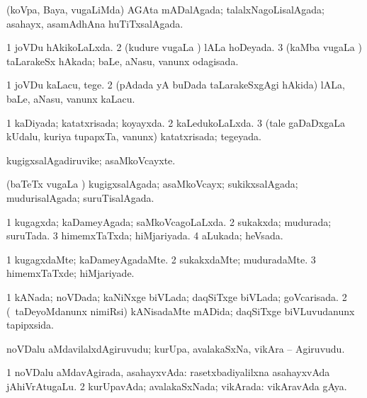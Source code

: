 \bentry
{} 
\gl{\gu}
\expl{}
\bmng
(koVpa, Baya, \mo vugaLiMda) AGAta mADalAgada; talalxNagoLisalAgada; asahayx, asamAdhAna huTiTxsalAgada. 
\emng
\eentry

\bentry
{} 
\gl{\gu}
\expl{}
\bmng
\bnum
\num{1} joVDu hAkikoLaLxda. 
\num{2} (kudure \mo vugaLa \vi) lALa hoDeyada. 
\num{3} (kaMba \mo vugaLa \vi) taLarakeSx hAkada; baLe, aNasu, \mo vanunx odagisada. 
\enum
\emng
\eentry

\bentry
{} 
\gl{\sakirx}
\expl{}
\bmng
\bnum
\num{1} joVDu kaLacu, tege. 
\num{2} (pAdada yA buDada taLarakeSxgAgi hAkida) lALa, baLe, aNasu, \mo vanunx kaLacu. 
\enum
\emng
\eentry

\bentry
{} 
\gl{\gu}
\expl{}
\bmng
\bnum
\num{1} kaDiyada; katatxrisada; koyayxda. 
\num{2} kaLedukoLaLxda. 
\num{3} (tale gaDaDxgaLa kUdalu, kuriya tupapxTa, \mo vanunx) katatxrisada; tegeyada. 
\enum
\emng
\eentry

\bentry
{} 
\gl{\nA}
\expl{}
\bmng
kugigxsalAgadiruvike; asaMkoVcayxte. 
\emng
\eentry

\bentry
{} 
\gl{\gu}
\expl{}
\bmng
(baTeTx \mo vugaLa \vi) kugigxsalAgada; asaMkoVcayx; sukikxsalAgada; mudurisalAgada; suruTisalAgada. 
\emng
\eentry

\bentry
{} 
\gl{\gu}
\expl{}
\bmng
\bnum
\num{1} kugagxda; kaDameyAgada; saMkoVcagoLaLxda. 
\num{2} sukakxda; mudurada; suruTada. 
\num{3} himemxTaTxda; hiMjariyada. 
\num{4} aLukada; heVsada. 
\enum
\emng
\eentry

\bentry
{} 
\gl{\kirxvi}
\expl{}
\bmng
\bnum
\num{1} kugagxdaMte; kaDameyAgadaMte. 
\num{2} sukakxdaMte; muduradaMte. 
\num{3} himemxTaTxde; hiMjariyade. 
\enum
\emng
\eentry

\bentry
{} 
\gl{\gu}
\expl{}
\bmng
\bnum
\num{1} kANada; noVDada; kaNiNxge biVLada; daqSiTxge biVLada; goVcarisada. 
\num{2} (\kanmu\ taDeyoMdanunx nimiRsi) kANisadaMte mADida; daqSiTxge biVLuvudanunx tapipxsida. 
\enum
\emng
\eentry

\bentry
{} 
\gl{\nA}
\expl{}
\bmng
noVDalu aMdavilalxdAgiruvudu; kurUpa, avalakaSxNa, vikAra -- Agiruvudu. 
\emng
\eentry

\bentry
{} 
\gl{\gu}
\expl{}
\bmng
\bnum
\num{1} noVDalu aMdavAgirada, asahayxvAda:  rasetxbadiyalilxna asahayxvAda jAhiVrAtugaLu. 
\num{2} kurUpavAda; avalakaSxNada; vikArada:  vikAravAda gAya. 
\enum
\emng
\eentry

